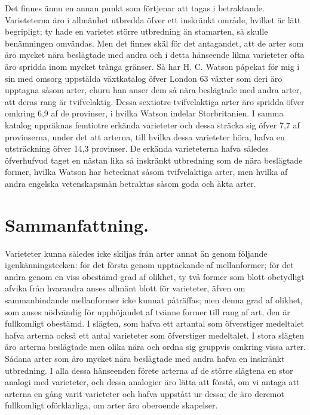 Det finnes ännu en annan punkt som förtjenar att tagas i betraktande. Varieteterna äro i allmänhet utbredda öfver ett inskränkt område, hvilket är lätt begripligt; ty hade en varietet större utbredning än stamarten, så skulle benämningen omvändas. Men det finnes skäl för det antagandet, att de arter som äro mycket nära beslägtade med andra och i detta hänseende likna varieteter ofta äro spridda inom mycket trånga gränser. Så har H. C. Watson påpekat för mig i sin med omsorg uppstälda växtkatalog öfver London 63 växter som deri äro upptagna såsom arter, ehuru han anser dem så nära beslägtade med andra arter, att deras rang är tvifvelaktig. Dessa sextiotre tvifvelaktiga arter äro spridda öfver omkring 6,9 af de provinser, i hvilka Watson indelar Storbritanien. I samma katalog uppräknas femtiotre erkända varieteter och dessa sträcka sig öfver 7,7 af provinserna, under det att arterna, till hvilka dessa varieteter höra, hafva en utsträckning öfver 14,3 provinser. De erkända varieteterna hafva således öfverhufvud taget en nästan lika så inskränkt utbredning som de nära beslägtade former, hvilka Watson har betecknat såsom tvifvelaktiga arter, men hvilka af andra engelska vetenskapsmän betraktas såsom goda och äkta arter.



\section{Sammanfattning.}

Varieteter kunna således icke skiljas från arter annat än genom följande igenkänningstecken: för det första genom upptäckande af mellanformer; för det andra genom en viss obestämd grad af olikhet, ty två former som blott obetydligt afvika från hvarandra anses allmänt blott för varieteter, äfven om sammanbindande mellanformer icke kunnat påträffas; men denna grad af olikhet, som anses nödvändig för upphöjandet af tvänne former till rang af art, den är fullkomligt obestämd. I slägten, som hafva ett artantal som öfverstiger medeltalet hafva arterna också ett antal varieteter som öfverstiger medeltalet. I stora slägten äro arterna beslägtade men olika nära och ordna sig gruppvis omkring vissa arter. Sådana arter som äro mycket nära beslägtade med andra hafva en inskränkt utbredning. I alla dessa hänseenden förete arterna af de större slägtena en stor analogi med varieteter, och dessa analogier äro lätta att förstå, om vi antaga att arterna en gång varit varieteter och hafva uppstått ur dessa; de äro deremot fullkomligt oförklarliga, om arter äro oberoende skapelser.

